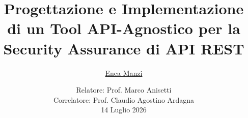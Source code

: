 
\title{Progettazione e Implementazione di un Tool API-Agnostico per la Security Assurance di API REST}
\author{\href{mailto:enea.manzi@studenti.unimi.it}{Enea Manzi}}
\date{
	Relatore: Prof. Marco Anisetti\\
	Correlatore: Prof. Claudio Agostino Ardagna\\
	14 Luglio 2026} %
